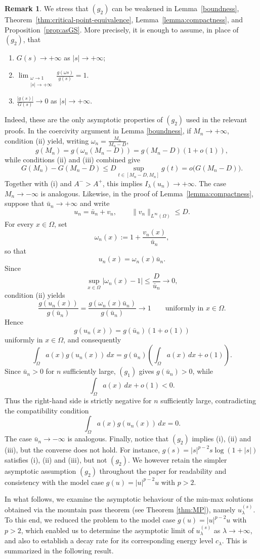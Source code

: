 \documentclass[11pt,reqno]{amsart}
\theoremstyle{plain}
\theoremstyle{definition}
\newtheorem{remark}[theorem]{Remark}
\numberwithin{equation}{section}
\begin{document}
\begin{remark}
We stress that $(g_2)$ can be weakened in Lemma~\ref{boundness},
Theorem~\ref{thm:critical-point-equivalence}, Lemma~\ref{lemma:compactness}, and Proposition~\ref{prop:asGS}.
More precisely, it is enough to assume, in place of $(g_2)$, that
\begin{enumerate}
    \item[(i)]
    $\displaystyle G(s)\to+\infty$ as $|s|\to+\infty$;

    \item[(ii)]
     $\displaystyle \lim_{\substack{\omega\to1\\ |s|\to+\infty}}
\frac{g(\omega s)}{g(s)}
=1.$
    \item[(iii)]
    $\displaystyle
    \frac{|g(s)|}{G(s)}\to0
    $ as $|s|\to+\infty$.
\end{enumerate}
Indeed, these are the only asymptotic properties of $(g_2)$
used in the relevant proofs. In the coercivity argument in Lemma \ref{boundness}, if
$M_n\to+\infty$, condition (ii) yield, writing $\omega_n = \frac{M_n}{M_n-D}$,
$$
g(M_n)= g(\omega_n (M_n-D))  =g(M_n-D)(1+o(1)),
$$
while conditions (ii) and (iii) combined give
$$
G(M_n)-G(M_n-D)
\le
D\sup_{t\in[M_n-D,M_n]}g(t)
=o\bigl(G(M_n-D)\bigr).
$$
Together with (i) and $A^- > A^+$, this implies
$I_\lambda(u_n)\to+\infty$. The case $M_n\to-\infty$ is
analogous. Likewise, in the proof of Lemma~\ref{lemma:compactness}, suppose that
$\bar u_n\to+\infty$ and write
$$
u_n=\bar u_n+v_n,
\qquad
\|v_n\|_{L^\infty(\Omega)}\le D.
$$
For every $x\in\Omega$, set
$$
\omega_n(x):=1+\frac{v_n(x)}{\bar u_n},
$$
so that
$$
u_n(x)=\omega_n(x)\bar u_n.
$$
Since
$$
\sup_{x\in\Omega}|\omega_n(x)-1|
\le \frac{D}{\bar u_n}\to0,
$$
condition (ii) yields
$$
\frac{g(u_n(x))}{g(\bar u_n)}
=
\frac{g(\omega_n(x)\bar u_n)}{g(\bar u_n)}
\to1 \qquad \text{uniformly in $x\in\Omega$.}
$$
Hence
$$
g(u_n(x))=g(\bar u_n)(1+o(1))
$$
uniformly in $x\in\Omega$, and consequently
$$
\int_\Omega a(x)g(u_n(x))\,dx
=
g(\bar u_n)
\left(
\int_\Omega a(x)\,dx+o(1)
\right).
$$
Since $\bar u_n>0$ for $n$ sufficiently large, $(g_1)$ gives
$g(\bar u_n)>0$, while
$$
\int_\Omega a(x)\,dx+o(1)<0.
$$
Thus the right-hand side is strictly negative for $n$ sufficiently large,
contradicting the compatibility condition
$$
\int_\Omega a(x)g(u_n(x))\,dx=0.
$$
The case $\bar u_n\to-\infty$ is analogous. Finally, notice that $(g_2)$ implies (i), (ii) and (iii), but the converse does not hold. For instance, $g(s)=|s|^{p-2}s\log(1+|s|)$ satisfies (i), (ii) and (iii), but not $(g_2)$. We however retain the simpler asymptotic assumption $(g_2)$ throughout
the paper for readability and consistency with the model case $g(u)= |u|^{p-2} u$ with $p>2$.
\end{remark}
In what follows, we examine the asymptotic behaviour of the min-max solutions obtained via the mountain pass theorem (see Theorem \ref{thm:MP}), namely $u_\lambda^{(s)}$. To this end, we reduced the problem to the model case $g(u) = |u|^{p-2} u$ with $p>2$, which enabled us to determine the asymptotic limit of $u_\lambda^{(s)}$ as $\lambda \to +\infty$, and also to establish a decay rate for its corresponding energy level $c_\lambda$. This is summarized in the following result.
\end{document}
